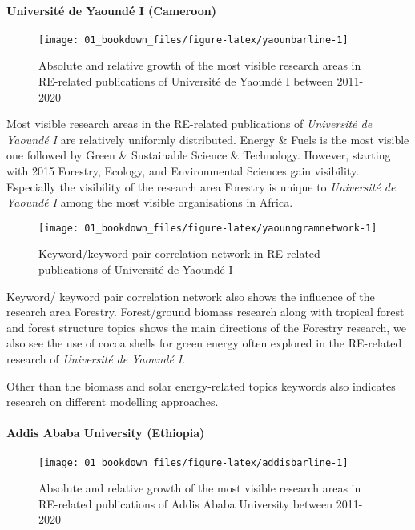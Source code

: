 \documentclass[12pt,twoside]{report}
\let\oldparagraph\paragraph
\renewcommand{\paragraph}[1]{\oldparagraph{#1}\mbox{}}
\begin{document}
\hypertarget{universituxe9-de-yaounduxe9-i-cameroon}{%
\paragraph{Université de Yaoundé I (Cameroon)}\label{universituxe9-de-yaounduxe9-i-cameroon}}

\begin{figure}
\texttt{[image: 01\_bookdown\_files/figure-latex/yaounbarline-1]} \caption{Absolute and relative growth of the most visible research areas in RE-related publications of Université de Yaoundé I between 2011-2020}\label{fig:yaounbarline}
\end{figure}

Most visible research areas in the RE-related publications of \emph{Université de Yaoundé I} are relatively uniformly distributed. Energy \& Fuels is the most visible one followed by Green \& Sustainable Science \& Technology. However, starting with 2015 Forestry, Ecology, and Environmental Sciences gain visibility. Especially the visibility of the research area Forestry is unique to \emph{Université de Yaoundé I} among the most visible organisations in Africa.

\begin{figure}
\texttt{[image: 01\_bookdown\_files/figure-latex/yaounngramnetwork-1]} \caption{Keyword/keyword pair correlation network in RE-related publications of Université de Yaoundé I}\label{fig:yaounngramnetwork}
\end{figure}

Keyword/ keyword pair correlation network also shows the influence of the research area Forestry. Forest/ground biomass research along with tropical forest and forest structure topics shows the main directions of the Forestry research, we also see the use of cocoa shells for green energy often explored in the RE-related research of \emph{Université de Yaoundé I}.

Other than the biomass and solar energy-related topics keywords also indicates research on different modelling approaches.

\hypertarget{addis-ababa-university-ethiopia}{%
\paragraph{Addis Ababa University (Ethiopia)}\label{addis-ababa-university-ethiopia}}

\begin{figure}
\texttt{[image: 01\_bookdown\_files/figure-latex/addisbarline-1]} \caption{Absolute and relative growth of the most visible research areas in RE-related publications of Addis Ababa University between 2011-2020}\label{fig:addisbarline}
\end{figure}
\end{document}
